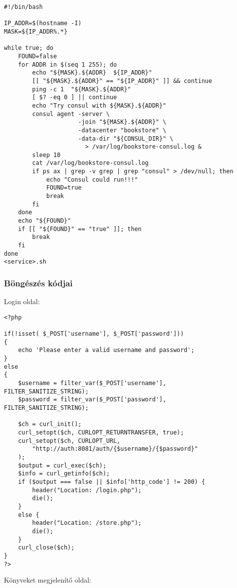 \begin{verbatim}
#!/bin/bash

IP_ADDR=$(hostname -I)
MASK=${IP_ADDR%.*}

while true; do
    FOUND=false
    for ADDR in $(seq 1 255); do
        echo "${MASK}.${ADDR}  ${IP_ADDR}"
        [[ "${MASK}.${ADDR}" == "${IP_ADDR}" ]] && continue
        ping -c 1  "${MASK}.${ADDR}"
        [ $? -eq 0 ] || continue
        echo "Try consul with ${MASK}.${ADDR}"
        consul agent -server \
                     -join "${MASK}.${ADDR}" \
                     -datacenter "bookstore" \
                     -data-dir "${CONSUL_DIR}" \
                       > /var/log/bookstore-consul.log &
        sleep 10
        cat /var/log/bookstore-consul.log
        if ps ax | grep -v grep | grep "consul" > /dev/null; then
            echo "Consul could run!!!"
            FOUND=true
            break
        fi
    done
    echo "${FOUND}"
    if [[ "${FOUND}" == "true" ]]; then
        break
    fi
done
<service>.sh
\end{verbatim}

\subsubsection{\texorpdfstring{Böngészés
kódjai\label{appendix-http}}{Böngészés kódjai}}\label{buxf6nguxe9szuxe9s-kuxf3djai}

Login oldal:

\begin{verbatim}
<?php

if(!isset( $_POST['username'], $_POST['password']))
{
    echo 'Please enter a valid username and password';
}
else
{
    $username = filter_var($_POST['username'], FILTER_SANITIZE_STRING);
    $password = filter_var($_POST['password'], FILTER_SANITIZE_STRING);

    $ch = curl_init();
    curl_setopt($ch, CURLOPT_RETURNTRANSFER, true);
    curl_setopt($ch, CURLOPT_URL,
        "http://auth:8081/auth/{$username}/{$password}"
    );
    $output = curl_exec($ch);
    $info = curl_getinfo($ch);
    if ($output === false || $info['http_code'] != 200) {
        header("Location: /login.php");
        die();
    }
    else {
        header("Location: /store.php");
        die();
    }
    curl_close($ch);
}
?>
\end{verbatim}

Könyveket megjelenítő oldal:

